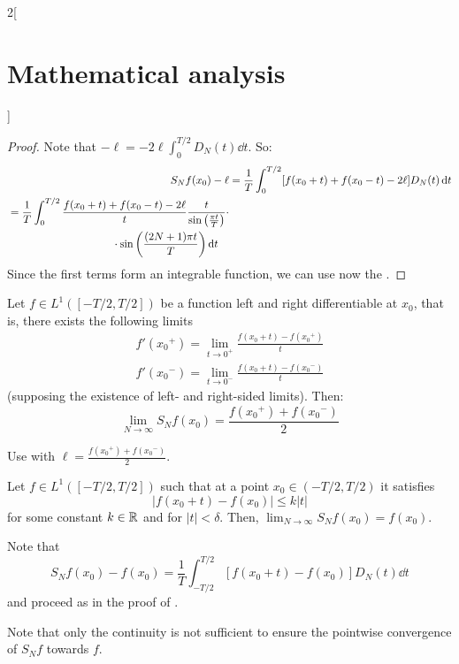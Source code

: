 \documentclass[../../../main_math.tex]{subfiles}
\begin{document}
\begin{multicols}{2}[\section{Mathematical analysis}]
\begin{theorem}
  \end{theorem}
  \begin{proof}
    Note that $-\ell=-2\ell\int_{0}^{T/2}D_N(t)\dd{t}$. So:
    \begin{align*}
      S_Nf(x_0)-\ell & =\frac{1}{T}\int_0^{T/2}[f(x_0+t)+f(x_0-t) - 2\ell]D_N(t)\dd{t} \\
      \begin{split}
         & =\frac{1}{T}\int_{0}^{T/2}\frac{f(x_0+t)+f(x_0-t) - 2\ell}{t}\frac{t}{\sin\left(\frac{\pi t}{T}\right)}\cdot \\
         & \hspace{3.4cm}\cdot\sin\left(\frac{(2N+1)\pi t}{T}\right)\dd{t}
      \end{split}
    \end{align*}
    Since the first terms form an integrable function, we can use now the .
  \end{proof}
  \begin{corollary}
    Let $f\in L^1([-T/2,T/2])$ be a function left and right differentiable at $x_0$, that is, there exists the following limits
    \begin{gather*}
      f'({x_0}^+)=\lim_{t\to0^+}\frac{f(x_0+t)-f({x_0}^+)}{t}\\
      f'({x_0}^-)=\lim_{t\to0^-}\frac{f(x_0+t)-f({x_0}^-)}{t}
    \end{gather*}(supposing the existence of left- and right-sided limits). Then: $$\lim_{N\to\infty}S_Nf(x_0)=\frac{f({x_0}^+)+f({x_0}^-)}{2}$$
  \end{corollary}
  \begin{sproof}
    Use  with $\ell=\frac{f({x_0}^+)+f({x_0}^-)}{2}$.
  \end{sproof}
  \begin{theorem}
    Let $f\in L^1([-T/2,T/2])$ such that at a point $x_0\in (-T/2,T/2)$ it satisfies $$|f(x_0+t)-f(x_0)|\leq k|t|$$ for some constant $k\in\mathbb{R} $ and for $|t|<\delta$. Then, $\displaystyle\lim_{N\to\infty}S_Nf(x_0)=f(x_0)$.
  \end{theorem}
  \begin{sproof}
    Note that
    $$S_Nf(x_0)-f(x_0) =\frac{1}{T}\int_{-T/2}^{T/2}[f(x_0+t) - f(x_0)]D_N(t)\dd{t}$$
    and proceed as in the proof of .
  \end{sproof}
  \begin{remark}
    Note that only the continuity is not sufficient to ensure the pointwise convergence of $S_Nf$ towards $f$.
  \end{remark}

\end{multicols}
\end{document}
